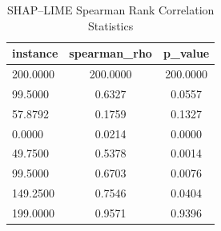\begin{table}
\centering
\caption{SHAP–LIME Spearman Rank Correlation Statistics}
\label{tab:agreement}
\begin{tabular}{lcc}
\toprule
instance & spearman_rho & p_value \\
\midrule
200.0000 & 200.0000 & 200.0000 \\
99.5000 & 0.6327 & 0.0557 \\
57.8792 & 0.1759 & 0.1327 \\
0.0000 & 0.0214 & 0.0000 \\
49.7500 & 0.5378 & 0.0014 \\
99.5000 & 0.6703 & 0.0076 \\
149.2500 & 0.7546 & 0.0404 \\
199.0000 & 0.9571 & 0.9396 \\
\bottomrule
\end{tabular}
\end{table}
